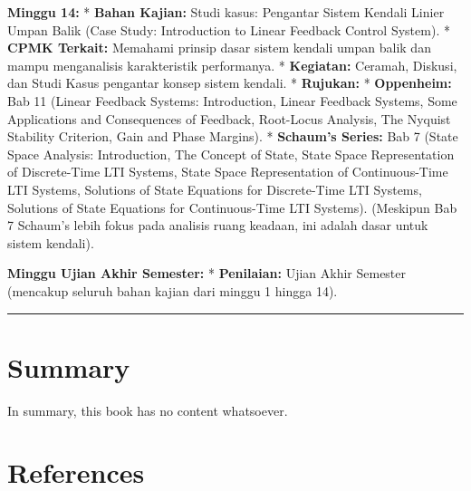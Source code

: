 \documentclass[
  letterpaper,
  DIV=11,
  numbers=noendperiod]{scrreprt}
\begin{document}
\textbf{Minggu 14:} * \textbf{Bahan Kajian:} Studi kasus: Pengantar
Sistem Kendali Linier Umpan Balik (Case Study: Introduction to Linear
Feedback Control System). * \textbf{CPMK Terkait:} Memahami prinsip
dasar sistem kendali umpan balik dan mampu menganalisis karakteristik
performanya. * \textbf{Kegiatan:} Ceramah, Diskusi, dan Studi Kasus
pengantar konsep sistem kendali. * \textbf{Rujukan:} *
\textbf{Oppenheim:} Bab 11 (Linear Feedback Systems: Introduction,
Linear Feedback Systems, Some Applications and Consequences of Feedback,
Root-Locus Analysis, The Nyquist Stability Criterion, Gain and Phase
Margins). * \textbf{Schaum's Series:} Bab 7 (State Space Analysis:
Introduction, The Concept of State, State Space Representation of
Discrete-Time LTI Systems, State Space Representation of Continuous-Time
LTI Systems, Solutions of State Equations for Discrete-Time LTI Systems,
Solutions of State Equations for Continuous-Time LTI Systems). (Meskipun
Bab 7 Schaum's lebih fokus pada analisis ruang keadaan, ini adalah dasar
untuk sistem kendali).

\textbf{Minggu Ujian Akhir Semester:} * \textbf{Penilaian:} Ujian Akhir
Semester (mencakup seluruh bahan kajian dari minggu 1 hingga 14).

\begin{center}\rule{0.5\linewidth}{0.5pt}\end{center}


\chapter{Summary}\label{summary}

In summary, this book has no content whatsoever.


\chapter*{References}\label{references}


\label{refs}
\end{document}
